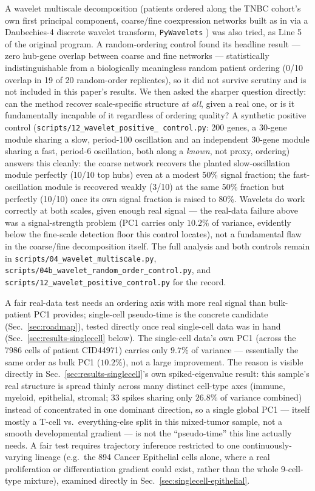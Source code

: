 \documentclass[11pt]{article}
\begin{document}
A wavelet multiscale decomposition (patients ordered along the
TNBC cohort's own first principal component, coarse/fine coexpression
networks built as in \citet{konig2006} via a Daubechies-4 discrete
wavelet transform, \texttt{PyWavelets} \citealp{pywavelets2019}) was
also tried, as Line 5 of the original program. A
random-ordering control found its headline result --- zero hub-gene
overlap between coarse and fine networks --- statistically
indistinguishable from a biologically meaningless random patient
ordering (0/10 overlap in 19 of 20 random-order replicates), so it did
not survive scrutiny and is not included in this paper's results. We
then asked the sharper question directly: can the method recover
scale-specific structure \emph{at all}, given a real one, or is it
fundamentally incapable of it regardless of ordering quality? A
synthetic positive control (\texttt{scripts/12\_wavelet\_positive\_
control.py}: 200 genes, a 30-gene module sharing a slow, period-100
oscillation and an independent 30-gene module sharing a fast,
period-6 oscillation, both along a \emph{known}, not proxy, ordering)
answers this cleanly: the coarse network recovers the planted
slow-oscillation module perfectly (10/10 top hubs) even at a modest
50\% signal fraction; the fast-oscillation module is recovered weakly
(3/10) at the same 50\% fraction but perfectly (10/10) once its own
signal fraction is raised to 80\%. Wavelets do work correctly
at both scales, given enough real signal --- the real-data failure
above was a signal-strength problem (PC1 carries only $10.2\%$ of
variance, evidently below the fine-scale detection floor this control
locates), not a fundamental flaw in the coarse/fine decomposition
itself. The full analysis and both controls remain in
\texttt{scripts/04\_wavelet\_multiscale.py},
\texttt{scripts/04b\_wavelet\_random\_order\_control.py}, and
\texttt{scripts/12\_wavelet\_positive\_control.py} for the record.

A fair real-data test needs an ordering axis with more real signal than
bulk-patient PC1 provides; single-cell pseudo-time is the concrete
candidate (Sec.~\ref{sec:roadmap}), tested directly once real
single-cell data was in hand (Sec.~\ref{sec:results-singlecell} below).
The single-cell data's own PC1 (across the 7986 cells of patient
CID44971) carries only $9.7\%$ of variance --- essentially the same
order as bulk PC1 ($10.2\%$), not a large improvement. The reason is
visible directly in Sec.~\ref{sec:results-singlecell}'s own
spiked-eigenvalue result: this sample's real structure is spread
thinly across many distinct cell-type axes (immune, myeloid,
epithelial, stromal; 33 spikes sharing only $26.8\%$ of variance
combined) instead of concentrated in one dominant direction, so a
single global PC1 --- itself mostly a T-cell vs.\ everything-else split
in this mixed-tumor sample, not a smooth developmental gradient --- is
not the ``pseudo-time'' this line actually needs. A fair test requires
trajectory inference restricted to one continuously-varying lineage
(e.g.\ the 894 Cancer Epithelial cells alone, where a real
proliferation or differentiation gradient could exist, rather than the
whole 9-cell-type mixture), examined directly in
Sec.~\ref{sec:singlecell-epithelial}.
\end{document}
